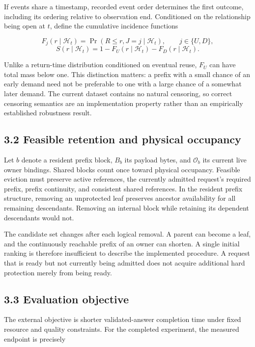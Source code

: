 \documentclass[
  english,
  10pt,
]{article}
\begin{document}
If events share a timestamp, recorded event order determines the first
outcome, including its ordering relative to observation end. Conditioned
on the relationship being open at \(t\), define the cumulative incidence
functions

\[
F_j(r\mid\mathcal H_t)=\Pr(R\le r,J=j\mid\mathcal H_t),
\qquad j\in\{U,D\},
\] \[
S(r\mid\mathcal H_t)=1-F_U(r\mid\mathcal H_t)-F_D(r\mid\mathcal H_t).
\]

Unlike a return-time distribution conditioned on eventual reuse, \(F_U\)
can have total mass below one. This distinction matters: a prefix with a
small chance of an early demand need not be preferable to one with a
large chance of a somewhat later demand. The current dataset contains no
natural censoring, so correct censoring semantics are an implementation
property rather than an empirically established robustness result.

\subsection{3.2 Feasible retention and physical
occupancy}\label{feasible-retention-and-physical-occupancy}

Let \(b\) denote a resident prefix block, \(B_b\) its payload bytes, and
\(\mathcal O_b\) its current live owner bindings. Shared blocks count
once toward physical occupancy. Feasible eviction must preserve active
references, the currently admitted request's required prefix, prefix
continuity, and consistent shared references. In the resident prefix
structure, removing an unprotected leaf preserves ancestor availability
for all remaining descendants. Removing an internal block while
retaining its dependent descendants would not.

The candidate set changes after each logical removal. A parent can
become a leaf, and the continuously reachable prefix of an owner can
shorten. A single initial ranking is therefore insufficient to describe
the implemented procedure. A request that is ready but not currently
being admitted does not acquire additional hard protection merely from
being ready.

\subsection{3.3 Evaluation objective}\label{evaluation-objective}

The external objective is shorter validated-answer completion time under
fixed resource and quality constraints. For the completed experiment,
the measured endpoint is precisely
\end{document}
